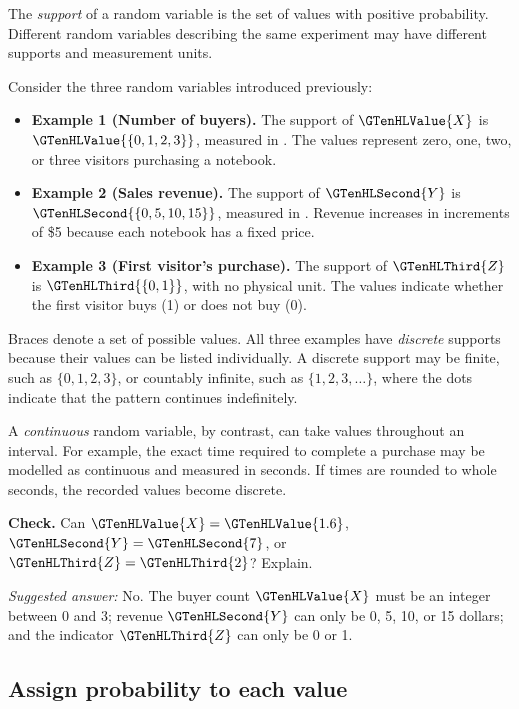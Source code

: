 The \emph{support} of a random variable is the set of values with positive probability. Different random variables describing the same experiment may have different supports and measurement units.

Consider the three random variables introduced previously:

\begin{itemize}
	\item \textbf{Example 1 (Number of buyers).}
	The support of $\GTenHLValue{X}$ is $\GTenHLValue{\{0,1,2,3\}}$, measured in .
	The values represent zero, one, two, or three visitors
	purchasing a notebook.
	
	\item \textbf{Example 2 (Sales revenue).}
	The support of $\GTenHLSecond{Y}$ is $\GTenHLSecond{\{0,5,10,15\}}$, measured in .
	Revenue increases in increments of \$5 because each
	notebook has a fixed price.
	
	\item \textbf{Example 3 (First visitor's purchase).}
	The support of $\GTenHLThird{Z}$ is $\GTenHLThird{\{0,1\}}$, with no physical unit.
	The values indicate whether the first visitor buys (1)
	or does not buy (0).
\end{itemize}

Braces denote a set of possible values. All three examples have \emph{discrete} supports because their values can be listed individually. A discrete support may be finite, such as $\{0,1,2,3\}$, or countably infinite, such as $\{1,2,3,\ldots\}$, where the dots indicate that the pattern continues indefinitely.

A \emph{continuous} random variable, by contrast, can take values throughout an interval. For example, the exact time required to complete a purchase may be modelled as continuous and measured in seconds. If times are rounded to whole seconds, the recorded values become discrete.

\textbf{Check.} Can $\GTenHLValue{X}=\GTenHLValue{1.6}$, $\GTenHLSecond{Y}=\GTenHLSecond{7}$, or $\GTenHLThird{Z}=\GTenHLThird{2}$? Explain.

\emph{Suggested answer:} No. The buyer count $\GTenHLValue{X}$ must be an integer between 0 and 3; revenue $\GTenHLSecond{Y}$ can only be 0, 5, 10, or 15 dollars; and the indicator $\GTenHLThird{Z}$ can only be 0 or 1.


\subsection{Assign probability to each value}

